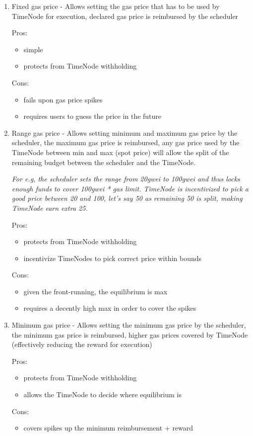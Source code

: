\documentclass{report}
\begin{document}
  \begin{enumerate}
    \item
      Fixed gas price - Allows setting the gas price that has to be used by TimeNode for execution, declared gas price is reimbursed by the scheduler

      Pros:
      \begin{itemize}
        \item simple
        \item protects from TimeNode withholding
      \end{itemize}
      Cons:
      \begin{itemize}
        \item fails upon gas price spikes
        \item requires users to guess the price in the future
      \end{itemize}

    \item
      Range gas price - Allows setting minimum and maximum gas price by the scheduler, the maximum gas price is reimbursed, any gas price used by the TimeNode between min and max (spot price) will allow the split of the remaining budget between the scheduler and the TimeNode.

      \textit{For e.g, the scheduler sets the range from 20gwei to 100gwei and thus locks enough funds to cover 100gwei * gas limit. TimeNode is incentivized to pick a good price between 20 and 100, let’s say 50 as remaining 50 is split, making TimeNode earn extra 25.}

      Pros:
      \begin{itemize}
        \item protects from TimeNode withholding
        \item incentivize TimeNodes to pick correct price within bounds
      \end{itemize}
      Cons:
      \begin{itemize}
        \item given the front-running, the equilibrium is max
        \item requires a decently high max in order to cover the spikes
      \end{itemize}

    \item
      Minimum gas price - Allows setting the minimum gas price by the scheduler, the minimum gas price is reimbursed, higher gas prices covered by TimeNode (effectively reducing the reward for execution)

      Pros:
      \begin{itemize}
        \item protects from TimeNode withholding
        \item allows the TimeNode to decide where equilibrium is
      \end{itemize}
      Cons:
      \begin{itemize}
        \item covers spikes up the minimum reimbursement + reward
      \end{itemize}
  \end{enumerate}
\end{document}
